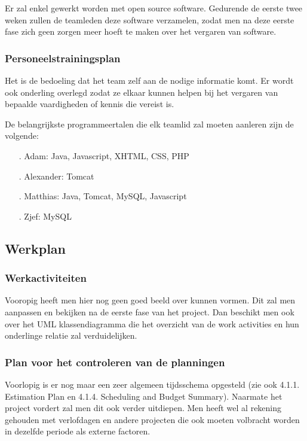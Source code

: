 \documentclass{article}
\begin{document}
Er zal enkel gewerkt worden met open source software. Gedurende de eerste twee weken zullen de teamleden deze software verzamelen, zodat men na deze eerste fase zich geen zorgen meer hoeft te maken over het vergaren van software. 

\subsubsection{Personeelstrainingsplan}

Het is de bedoeling dat het team zelf aan de nodige informatie komt. Er wordt ook onderling overlegd zodat ze elkaar kunnen helpen bij het vergaren van bepaalde vaardigheden of kennis die vereist is.

De belangrijkste programmeertalen die elk teamlid zal moeten aanleren zijn de volgende:

\begin{itemize}
\item[.] Adam: Java, Javascript, XHTML, CSS, PHP \\[-5mm]
\item[.] Alexander: Tomcat \\[-5mm]
\item[.] Matthias: Java, Tomcat, MySQL, Javascript \\[-5mm]
\item[.] Zjef: MySQL \\[-5mm]
\end{itemize}

\subsection{Werkplan}

\subsubsection{Werkactiviteiten}

Vooropig heeft men hier nog geen goed beeld over kunnen vormen. Dit zal men aanpassen en bekijken na de eerste fase van het project. Dan beschikt men ook over het UML klassendiagramma die het overzicht van de work activities en hun onderlinge relatie zal verduidelijken.

\subsubsection{Plan voor het controleren van de planningen}

Voorlopig is er nog maar een zeer algemeen tijdsschema opgesteld (zie ook 4.1.1. Estimation Plan en 4.1.4. Scheduling and Budget Summary). Naarmate het project vordert zal men dit ook verder uitdiepen. Men heeft wel al rekening gehouden met verlofdagen en andere projecten die ook moeten volbracht worden in dezelfde periode als externe factoren.
\end{document}
